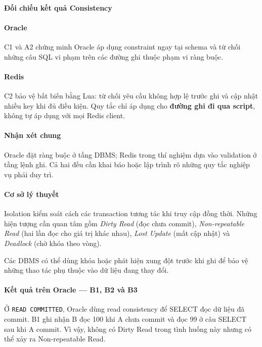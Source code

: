 \paragraph*{Đối chiếu kết quả Consistency}

\paragraph*{Oracle}

C1 và A2 chứng minh Oracle áp dụng constraint ngay tại schema và từ chối những câu SQL vi phạm trên các đường ghi thuộc phạm vi ràng buộc.

\paragraph*{Redis}

C2 bảo vệ bất biến bằng Lua: từ chối yêu cầu không hợp lệ trước ghi và cập nhật nhiều key khi đủ điều kiện. Quy tắc chỉ áp dụng cho \textbf{đường ghi đi qua script}, không tự áp dụng với mọi Redis client.

\paragraph*{Nhận xét chung}

Oracle đặt ràng buộc ở tầng DBMS; Redis trong thí nghiệm dựa vào validation ở tầng lệnh ghi. Cả hai đều cần khai báo hoặc lập trình rõ những quy tắc nghiệp vụ phải duy trì.

\label{sec:tx-2-3}
\paragraph*{Cơ sở lý thuyết}

Isolation kiểm soát cách các transaction tương tác khi truy cập đồng thời. Những hiện tượng cần quan tâm gồm \emph{Dirty Read} (đọc chưa commit), \emph{Non-repeatable Read} (hai lần đọc cho giá trị khác nhau), \emph{Lost Update} (mất cập nhật) và \emph{Deadlock} (chờ khóa theo vòng).

Các DBMS có thể dùng khóa hoặc phát hiện xung đột trước khi ghi để bảo vệ những thao tác phụ thuộc vào dữ liệu đang thay đổi.

\paragraph*{Kết quả trên Oracle — B1, B2 và B3}

Ở \texttt{READ COMMITTED}, Oracle dùng read consistency để SELECT đọc dữ liệu đã commit. B1 ghi nhận B đọc 100 khi A chưa commit và đọc 99 ở câu SELECT sau khi A commit. Vì vậy, không có Dirty Read trong tình huống này nhưng có thể xảy ra Non-repeatable Read.

